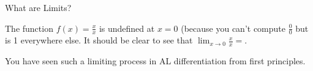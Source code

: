 \documentclass[8pt]{beamer}
\begin{document}
\begin{frame}[shrink=5]{What are Limits?}
     \centering

			    The function $f(x)=\frac{x}{x}$ is undefined at $x=0$ (because you can't compute $\frac{0}{0}$ but is 1 everywhere else. It should be clear to see that $\lim_{x \to 0} \frac{x}{x}=$.

\alert{You have seen such a limiting process in AL differentiation from first principles.}
\end{frame}
\end{document}
